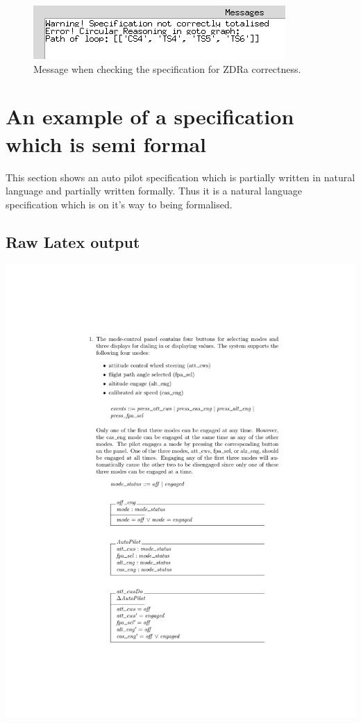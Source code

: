 \begin{figure}[H]
\includegraphics[scale=0.7]{examples/nonworkzdra/incorrect.png}
\caption{Message when checking the specification for ZDRa correctness. \label{app:failzdraoutmessgae}}
\end{figure}

\section{An example of a specification which is semi formal}
\label{app:semiform}
This section shows an auto pilot specification which is partially written in natural language and partially written formally. Thus it is a natural language specification which is on it's way to being formalised.

\subsection{Raw Latex output}
\noindent \includegraphics[clip, trim=4cm 4cm 4cm 4.2cm, scale=0.9]{examples/semiform/0.pdf}

